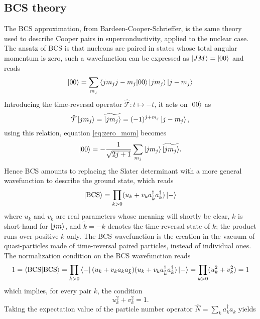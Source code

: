 \subsection{BCS theory}
The BCS approximation, from Bardeen-Cooper-Schrieffer, is the same theory used to describe Cooper pairs in superconductivity, applied to the nuclear case.
The ansatz of BCS is that nucleons are paired in states whose total angular momentum is zero, such a wavefunction can be expressed as $\ket{JM}=\ket{00}$ and reads
\begin{equation}
    \label{eq:zero_mom}
    \ket{00} = \sum_{m_j} \bra{jm_j j-m_j}\ket{00}\ket{jm_j}\ket{j-m_j}
\end{equation}
Introducing the time-reversal operator $\hat {\mathcal T}:t\mapsto -t$, it acts on $\ket{00}$ as 
\begin{equation}
    \hat {\mathcal T} \ket{jm_j} = \widetilde{\ket{{jm_j}}} = (-1)^{j+m_j}\ket{j-m_j},
\end{equation}
using this relation, equation \eqref{eq:zero_mom} becomes 
\begin{equation}
    \ket{00} =- \frac{1}{\sqrt{2j+1}}\sum_{m_j}\ket{jm_j}\widetilde{\ket{{jm_j}}}.
\end{equation}
Hence BCS amounts to replacing the Slater determinant with a more general wavefunction to describe the ground state, which reads
\begin{equation}
    \label{eq:bcs_det}
    \ket{\text{BCS}} = \prod_{k>0}(u_k+ v_k a_{\tilde k}^\dagger a_k^\dagger) \ket{-}
\end{equation}
where $u_k$ and $v_k$ are real parameters whose meaning will shortly be clear, $k$ is short-hand for $\ket{jm}$, and $\tilde k = -k$ denotes the time-reversal state of $k$; the product runs over positive $k$ only. The BCS wavefunction is the creation in the vacuum of quasi-particles made of time-reversal paired particles, instead of individual ones. The normalization condition on the BCS wavefunction reads
\begin{equation}
    \label{eq:bcs_norm}
    1=\braket{\text{BCS}} = \prod_{k>0} \bra{-}(u_{k}+v_{k}a_{k}a_{\tilde k})(u_k+v_k a_{\tilde k}^\dagger a_k^\dagger)\ket{-} =\prod_{k>0}(u_k^2+v_k^2)=1
\end{equation}
which implies, for every pair $k$, the condition
\begin{equation}
    \label{eq:norm_uv}
    u_k^2+v_k^2=1.
\end{equation}
Taking the expectation value of the particle number operator $\hat N = \sum_k a_k ^\dagger a_k$ yields \cite{bertulani2007nuclear}
